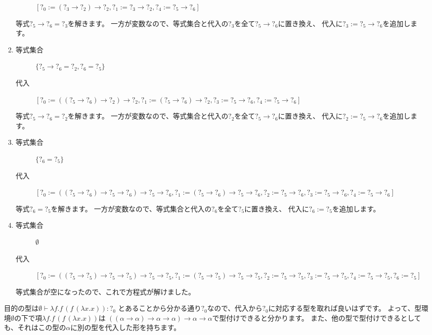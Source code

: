 \begin{enumerate}
\begin{description}
       $[?_0 := (?_3 \to ?_2) \to ?_2, ?_1 := ?_3 \to ?_2, ?_4 := ?_5 \to ?_6]$
    \end{description}
    等式$?_5 \to ?_6 = ?_3$を解きます。
    一方が変数なので、等式集合と代入の$?_3$を全て$?_5 \to ?_6$に置き換え、
    代入に$?_3 := ?_5 \to ?_6$を追加します。
  \item
    \begin{description}
      \item[等式集合]
       $\{?_5 \to ?_6 = ?_2, ?_6 = ?_5\}$
      \item[代入]
       $[?_0 := ((?_5 \to ?_6) \to ?_2) \to ?_2, ?_1 := (?_5 \to ?_6) \to ?_2,
          ?_3 := ?_5 \to ?_6, ?_4 := ?_5 \to ?_6]$
    \end{description}
    等式$?_5 \to ?_6 = ?_2$を解きます。
    一方が変数なので、等式集合と代入の$?_2$を全て$?_5 \to ?_6$に置き換え、
    代入に$?_2 := ?_5 \to ?_6$を追加します。
  \item
    \begin{description}
      \item[等式集合]
       $\{?_6 = ?_5\}$
      \item[代入]
       $[?_0 := ((?_5 \to ?_6) \to ?_5 \to ?_6) \to ?_5 \to ?_6,
          ?_1 := (?_5 \to ?_6) \to ?_5 \to ?_6, ?_2 := ?_5 \to ?_6, ?_3 := ?_5 \to ?_6,
          ?_4 := ?_5 \to ?_6]$
    \end{description}
    等式$?_6 = ?_5$を解きます。
    一方が変数なので、等式集合と代入の$?_6$を全て$?_5$に置き換え、
    代入に$?_6 := ?_5$を追加します。
  \item
    \begin{description}
      \item[等式集合]
       $\emptyset$
      \item[代入]
       $[?_0 := ((?_5 \to ?_5) \to ?_5 \to ?_5) \to ?_5 \to ?_5,
          ?_1 := (?_5 \to ?_5) \to ?_5 \to ?_5, ?_2 := ?_5 \to ?_5, ?_3 := ?_5 \to ?_5,
          ?_4 := ?_5 \to ?_5, ?_6 := ?_5]$
    \end{description}
    等式集合が空になったので、これで方程式が解けました。
\end{enumerate}

目的の型は$\emptyset \vdash \lambda f . f \, (f \, (\lambda x . x)) : ?_0$
とあることから分かる通り$?_0$なので、代入から$?_0$に対応する型を取れば良いはずです。
よって、型環境$\emptyset$の下で項$\lambda f . f \, (f \, (\lambda x . x))$は
$((\alpha \to \alpha) \to \alpha \to \alpha) \to \alpha \to \alpha$で型付けできると分かります。
また、他の型で型付けできるとしても、それはこの型の$\alpha$に別の型を代入した形を持ちます。

